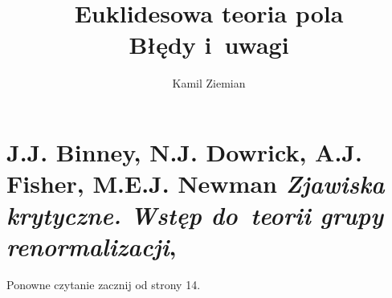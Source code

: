 \documentclass[a4paper,11pt]{article}
\title{Euklidesowa teoria pola \\
  {\Large Błędy i~uwagi}}
\author{Kamil Ziemian}
\numberwithin{equation}{section}
\begin{document}





\maketitle





\section{J.J. Binney, N.J. Dowrick, A.J. Fisher, M.E.J. Newman
  \textit{Zjawiska krytyczne. Wstęp do~teorii grupy
    renormalizacji},
  \parencite{Binney-Zjawiska-krytyczne-Pub-1998}}

\label{book:Binney-ETC-Zjawiska-krytyczne}

\vspace{0em}

Ponowne czytanie zacznij od strony 14.




































\end{document}
